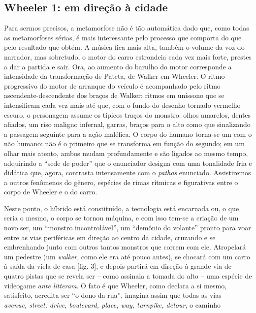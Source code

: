\begin{multicols}{2}
\section*{Wheeler 1:\allowbreak{} em direção à cidade}
\par{}Para sermos precisos,\allowbreak{} a metamorfose não é tão automática dado que,\allowbreak{} como todas as metamorfoses sérias,\allowbreak{} é mais interessante pelo processo que comporta do que pelo resultado que obtém.\allowbreak{} A música fica mais alta,\allowbreak{} também o volume da voz do narrador,\allowbreak{} mas sobretudo,\allowbreak{} o motor do carro estrondeia cada vez mais forte,\allowbreak{} prestes a dar a partida e sair.\allowbreak{} Ora,\allowbreak{} ao aumento do barulho do motor corresponde a intensidade da transformação de Pateta,\allowbreak{} de Walker em Wheeler.\allowbreak{} O ritmo progressivo do motor de arranque do veículo é acompanhado pelo ritmo ascendente-\allowbreak{}descendente dos braços de Walker:\allowbreak{} ritmos em uníssono que se intensificam cada vez mais até que,\allowbreak{} com o fundo do desenho tornado vermelho escuro,\allowbreak{} o personagem assume os típicos traços do monstro:\allowbreak{} olhos amarelos,\allowbreak{} dentes afiados,\allowbreak{} um riso maligno infernal,\allowbreak{} garras,\allowbreak{} braços para o alto como que sinalizando a passagem seguinte para a ação maléfica.\allowbreak{} O corpo do humano torna-\allowbreak{}se um com o não humano:\allowbreak{} não é o primeiro que se transforma em função do segundo; em um olhar mais atento,\allowbreak{} ambos mudam profundamente e são ligados ao mesmo tempo,\allowbreak{} adquirindo a “sede de poder” que o enunciador designa com uma tonalidade fria e didática que,\allowbreak{} agora,\allowbreak{} contrasta intensamente com o \textit{pathos} enunciado.\allowbreak{} Assistiremos a outros fenômenos do gênero,\allowbreak{} espécies de rimas rítmicas e figurativas entre o corpo de Wheeler e o do carro.\allowbreak{}\par{}Neste ponto,\allowbreak{} o híbrido está constituído,\allowbreak{} a tecnologia está encarnada ou,\allowbreak{} o que seria o mesmo,\allowbreak{} o corpo se tornou máquina,\allowbreak{} e com isso tem-\allowbreak{}se a criação de um novo ser,\allowbreak{} um “monstro incontrolável”,\allowbreak{} um “demônio do volante” pronto para voar entre as vias periféricas em direção ao centro da cidade,\allowbreak{} cruzando e se embrenhando junto com outros tantos monstros que correm com ele.\allowbreak{} Atropelará um pedestre (\allowbreak{}um \textit{walker},\allowbreak{} como ele era até pouco antes)\allowbreak{},\allowbreak{} se chocará com um carro à saída da viela de casa [fig.\allowbreak{} 3],\allowbreak{} e depois partirá em direção à grande via de quatro pistas que se revela ser – como assinala a tomada do alto – uma espécie de videogame \textit{ante litteram}.\allowbreak{} O fato é que Wheeler,\allowbreak{} como declara a si mesmo,\allowbreak{} satisfeito,\allowbreak{} acredita ser “o dono da rua”,\allowbreak{} imagina assim que todas as vias – \textit{avenue,\allowbreak{} street,\allowbreak{} drive,\allowbreak{} boulevard,\allowbreak{} place,\allowbreak{} way,\allowbreak{} turnpike,\allowbreak{} detour},\allowbreak{} o caminho 
\end{multicols}
